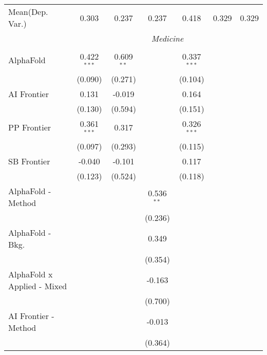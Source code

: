 \begin{tabular}{lcccccc}
Mean(Dep. Var.) & 0.303 & 0.237 & 0.237 & 0.418 & 0.329 & 0.329 \\
 & \multicolumn{6}{c}{\textit{Medicine}} \\ \\
   AlphaFold                     & 0.422$^{***}$ & 0.609$^{**}$ &               & 0.337$^{***}$ &        &   \\   
                                 & (0.090)       & (0.271)      &               & (0.104)       &        &   \\   
   AI Frontier                   & 0.131         & -0.019       &               & 0.164         &        &   \\   
                                 & (0.130)       & (0.594)      &               & (0.151)       &        &   \\   
   PP Frontier                   & 0.361$^{***}$ & 0.317        &               & 0.326$^{***}$ &        &   \\   
                                 & (0.097)       & (0.293)      &               & (0.115)       &        &   \\   
   SB Frontier                   & -0.040        & -0.101       &               & 0.117         &        &   \\   
                                 & (0.123)       & (0.524)      &               & (0.118)       &        &   \\   
   AlphaFold - Method            &               &              & 0.536$^{**}$  &               &        &   \\   
                                 &               &              & (0.236)       &               &        &   \\   
   AlphaFold - Bkg.              &               &              & 0.349         &               &        &   \\   
                                 &               &              & (0.354)       &               &        &   \\   
   AlphaFold x Applied - Mixed   &               &              & -0.163        &               &        &   \\   
                                 &               &              & (0.700)       &               &        &   \\   
   AI Frontier - Method          &               &              & -0.013        &               &        &   \\   
                                 &               &              & (0.364)       &               &        &   \\   

\end{tabular}
